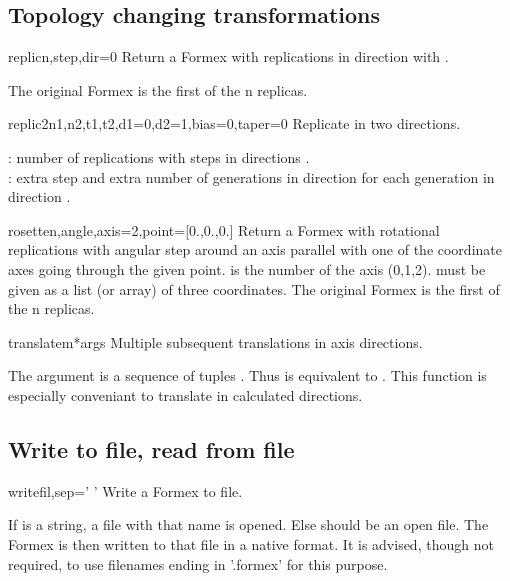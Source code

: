 {{\subsection{Topology changing transformations}

\begin{methoddesc}{replic}{n,step,dir=0}
Return a Formex with  replications in direction  with .

The original Formex is the first of the n replicas.
\end{methoddesc}

\begin{methoddesc}{replic2}{n1,n2,t1,t2,d1=0,d2=1,bias=0,taper=0}
Replicate in two directions.

 : number of replications with steps  in directions .\\
 : extra step and extra number of generations in direction  for each generation in direction .
\end{methoddesc}

\begin{methoddesc}{rosette}{n,angle,axis=2,point=[0.,0.,0.]}
Return a Formex with  rotational replications with angular step  around an axis parallel with one of the coordinate axes going through the given point.  is the number of the axis (0,1,2).  must be given as a list (or array) of three coordinates. The original Formex is the first of the n replicas.
\end{methoddesc}

\begin{methoddesc}{translatem}{*args}
Multiple subsequent translations in axis directions.

The argument  is a sequence of tuples . Thus  is equivalent to . This function is especially conveniant to translate in calculated directions.
\end{methoddesc}


\subsection{Write to file, read from file}


\begin{methoddesc}{write}{fil,sep=' '}
Write a Formex to file.

If  is a string, a file with that name is opened. Else  should
be an open file.
The Formex is then written to that file in a native format. It is advised, though not required, to use filenames ending in '.formex' for this purpose.


\end{methoddesc}}}
